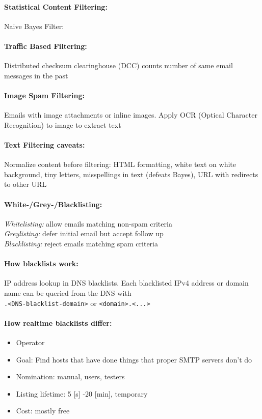 \paragraph{Statistical Content Filtering:} Naive Bayes Filter:

\paragraph{Traffic Based Filtering:} Distributed checksum clearinghouse (DCC) counts number of same email messages in the past 

\paragraph{Image Spam Filtering:} Emails with image attachments or inline images. Apply OCR (Optical Character Recognition) to image to extract text

\paragraph{Text Filtering caveats:} Normalize content before filtering: HTML formatting, white text on white background, tiny letters, misspellings in text (defeats Bayes), URL with redirects to other URL

\paragraph{White-/Grey-/Blacklisting:} \emph{Whitelisting:} allow emails matching non-spam criteria \\
\textit{Greylisting:} defer initial email but accept follow up \\
\textit{Blacklisting:} reject emails matching spam criteria

\paragraph{How blacklists work:} IP address lookup in DNS blacklists. Each blacklisted IPv4 address or domain name can be queried from the DNS with \\
{\tt <IP-address>.<DNS-blacklist-domain>} or {\tt <domain>.<...>}

\paragraph{How realtime blacklists differ:}
\begin{itemize}
\item Operator
\item Goal: Find hosts that have done things that proper SMTP servers don't do
\item Nomination: manual, users, testers 
\item Listing lifetime: 5 [s] -20 [min], temporary 
\item Cost: mostly free
\end{itemize}

